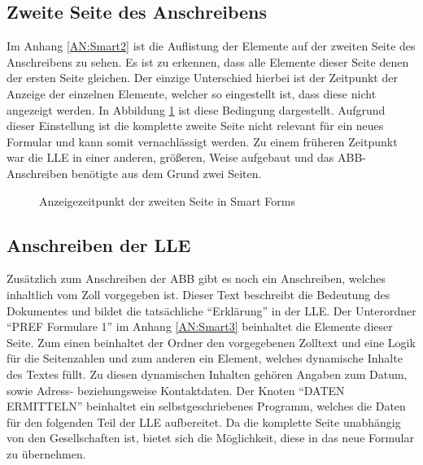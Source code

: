 	\subsection{Zweite Seite des Anschreibens}
	
	Im Anhang \ref{AN:Smart2} ist die Auflistung der Elemente auf der zweiten Seite des Anschreibens zu sehen. Es ist zu erkennen, dass alle Elemente dieser Seite denen der ersten Seite gleichen. Der einzige Unterschied hierbei ist der Zeitpunkt der Anzeige der einzelnen Elemente, welcher so eingestellt ist, dass diese nicht angezeigt werden. In Abbildung \ref{beding_smart} ist diese Bedingung dargestellt. Aufgrund dieser Einstellung ist die komplette zweite Seite nicht relevant für ein neues Formular und kann somit vernachlässigt werden. Zu einem früheren Zeitpunkt war die \ac{LLE} in einer anderen, größeren, Weise aufgebaut und das \ac{ABB}-Anschreiben benötigte aus dem Grund zwei Seiten.
	
	\begin{figure}[ht]
		\centering
		\caption{Anzeigezeitpunkt der zweiten Seite in Smart Forms}
		\label{beding_smart}
	\end{figure}
	
	\subsection{Anschreiben der \acs{LLE}}
	\label{ist:le}
	
	Zusätzlich zum Anschreiben der \ac{ABB} gibt es noch ein Anschreiben, welches inhaltlich vom Zoll vorgegeben ist. Dieser Text beschreibt die Bedeutung des Dokumentes und bildet die tatsächliche "`Erklärung"' in der \ac{LLE}. Der Unterordner "`PREF Formulare 1"' im Anhang \ref{AN:Smart3} beinhaltet die Elemente dieser Seite. Zum einen beinhaltet der Ordner den vorgegebenen Zolltext und eine Logik für die Seitenzahlen und zum anderen ein Element, welches dynamische Inhalte des Textes füllt. Zu diesen dynamischen Inhalten gehören Angaben zum Datum, sowie Adress- beziehungsweise Kontaktdaten. Der Knoten "`DATEN ERMITTELN"' beinhaltet ein selbstgeschriebenes Programm, welches die Daten für den folgenden Teil der \ac{LLE} aufbereitet. Da die komplette Seite unabhängig von den Gesellschaften ist, bietet sich die Möglichkeit, diese in das neue Formular zu übernehmen. 
	
